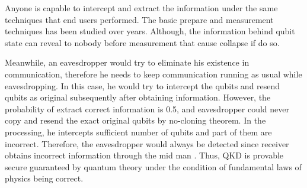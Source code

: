 \documentclass[12pt]{article}
\begin{document}
Anyone is capable to intercept and extract the information under the same techniques that end users performed. The basic prepare and measurement techniques has been studied over years. Although, the information behind qubit state can reveal to nobody before measurement that cause collapse if do so. 

Meanwhile, an eavesdropper would try to eliminate his existence in communication, therefore he needs to keep communication running as usual while eavesdropping. In this case, he would try to intercept the qubits and resend qubits as original subsequently after obtaining information. However, the probability of extract correct information is 0.5, and eavesdropper could never copy and resend the exact original qubits by no-cloning theorem. In the processing, he intercepts sufficient number of qubits and part of them are incorrect. Therefore, the eavesdropper would always be detected since receiver obtains incorrect information through the mid man \cite[p.593]{nielsen2000quantum}. Thus, QKD is provable secure guaranteed by quantum theory under the condition of fundamental laws of physics being correct.
\end{document}
